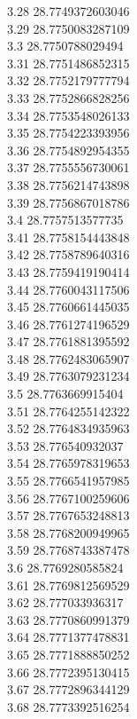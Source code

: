 {3.28	28.7749372603046\\
3.29	28.7750083287109\\
3.3	28.7750788029494\\
3.31	28.7751486852315\\
3.32	28.7752179777794\\
3.33	28.7752866828256\\
3.34	28.7753548026133\\
3.35	28.7754223393956\\
3.36	28.7754892954355\\
3.37	28.7755556730061\\
3.38	28.7756214743898\\
3.39	28.7756867018786\\
3.4	28.7757513577735\\
3.41	28.7758154443848\\
3.42	28.7758789640316\\
3.43	28.7759419190414\\
3.44	28.7760043117506\\
3.45	28.7760661445035\\
3.46	28.7761274196529\\
3.47	28.7761881395592\\
3.48	28.7762483065907\\
3.49	28.7763079231234\\
3.5	28.7763669915404\\
3.51	28.7764255142322\\
3.52	28.7764834935963\\
3.53	28.776540932037\\
3.54	28.7765978319653\\
3.55	28.7766541957985\\
3.56	28.7767100259606\\
3.57	28.7767653248813\\
3.58	28.7768200949965\\
3.59	28.7768743387478\\
3.6	28.7769280585824\\
3.61	28.7769812569529\\
3.62	28.777033936317\\
3.63	28.7770860991379\\
3.64	28.7771377478831\\
3.65	28.7771888850252\\
3.66	28.7772395130415\\
3.67	28.7772896344129\\
3.68	28.7773392516254\\
}
